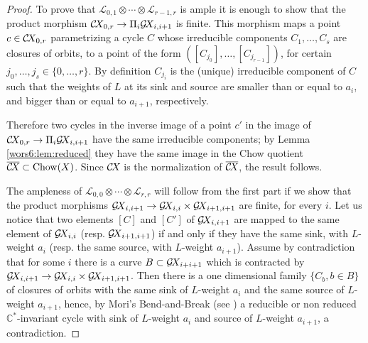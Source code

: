 \documentclass[10pt,a4paper]{article}
\numberwithin{equation}{section}
\theoremstyle{definition}
\theoremstyle{remark}
\def\C{{\mathbb C}}
\def\cL{{\mathcal L}}
\def\operatorname#1{\mathop{\rm #1}\nolimits}
\def\Chow{\operatorname{Chow}}
\def\GX{\mathcal{G}\!X\hspace{-0.5pt}}
\def\CX{\mathcal{C}\!X\hspace{-0.5pt}}
\begin{document}
\begin{proof} 
To prove that $\cL_{0,1}\otimes\cdots\otimes\cL_{r-1,r}$ is ample
it is enough to show that the product morphism $\CX_{0,r} \to \Pi_i \GX_{i,i+1}$ is finite. This morphism maps a point $c \in \CX_{0,r}$ parametrizing a cycle
$C$ whose irreducible components  $C_1, \dots, C_s$ are closures of orbits, to a point of the form $([C_{j_0}], \dots, [C_{j_{r-1}}])$, for certain $j_0,\dots,j_s\in \{0,\dots,r\}$.
By definition $C_{j_i}$ is the (unique) irreducible component of $C$ such that the weights of $L$ at its sink and source are smaller than or equal to $a_i$, and bigger than or equal to $ a_{i+1}$, respectively. 


Therefore two cycles in the inverse image of a point $c'$ in the image of $\CX_{0,r} \to \Pi_i \GX_{i,i+1}$ have the same irreducible components; by Lemma \ref{wors6:lem:reduced} they have the same image in the Chow quotient $\overline{\CX}\subset\Chow(X)$. Since $\CX$ is the normalization of $\overline{\CX}$,  the result follows.

The ampleness of $ \cL_{0,0}\otimes\cdots\otimes\cL_{r,r}$ will follow from the first part if we show that
 the product morphisms $\GX_{i,i+1}\rightarrow\GX_{i,i}\times\GX_{i+1,i+1}$ are finite, for every $i$. Let us notice that two elements $[C]$ and $[C']$ of $\GX_{i,i+1}$ are mapped to the same element of $\GX_{i,i}$ (resp. $\GX_{i+1,i+1}$) if and only if they have the same sink, with $L$-weight $a_i$ (resp.  the same source, with $L$-weight $a_{i+1}$).
Assume by contradiction that for some $i$ there is a curve $B\subset\GX_{i+i+1}$ which is contracted by $\GX_{i,i+1}\rightarrow\GX_{i,i}\times\GX_{i+1,i+1}$. Then there is a one dimensional family $\{C_b, b \in B\}$ of closures of orbits with the same sink of $L$-weight $a_i$ and the same source of  $L$-weight $a_{i+1}$, hence,  by Mori's Bend-and-Break (see \cite[Proposition 3.2]{wors6-De}) a reducible or non reduced $\C^*$-invariant cycle with sink of $L$-weight $a_i$ and source of  $L$-weight $a_{i+1}$, a contradiction.
\end{proof}
\end{document}
